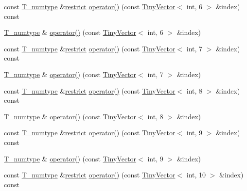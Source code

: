 \begin{DoxyCompactItemize}
\item 
const \hyperlink{classArray_ae72770f4a1d2f8b7193badafc320f008}{T\+\_\+numtype} \&\hyperlink{compiler_8h_a080abdcb9c02438f1cd2bb707af25af8}{restrict} \hyperlink{classArray_a366456aa63f9f9b54ade2e5ce2de8f9a}{operator()} (const \hyperlink{classTinyVector}{Tiny\+Vector}$<$ int, 6 $>$ \&index) const 
\item 
\hyperlink{classArray_ae72770f4a1d2f8b7193badafc320f008}{T\+\_\+numtype} \& \hyperlink{classArray_a68955d7efb206caf0365b81286f5430d}{operator()} (const \hyperlink{classTinyVector}{Tiny\+Vector}$<$ int, 6 $>$ \&index)
\item 
const \hyperlink{classArray_ae72770f4a1d2f8b7193badafc320f008}{T\+\_\+numtype} \&\hyperlink{compiler_8h_a080abdcb9c02438f1cd2bb707af25af8}{restrict} \hyperlink{classArray_a33104477dc9ae6b2eae364f7e3f9dfba}{operator()} (const \hyperlink{classTinyVector}{Tiny\+Vector}$<$ int, 7 $>$ \&index) const 
\item 
\hyperlink{classArray_ae72770f4a1d2f8b7193badafc320f008}{T\+\_\+numtype} \& \hyperlink{classArray_afe7da01389d310f5c7619fa138444e78}{operator()} (const \hyperlink{classTinyVector}{Tiny\+Vector}$<$ int, 7 $>$ \&index)
\item 
const \hyperlink{classArray_ae72770f4a1d2f8b7193badafc320f008}{T\+\_\+numtype} \&\hyperlink{compiler_8h_a080abdcb9c02438f1cd2bb707af25af8}{restrict} \hyperlink{classArray_a4e2a5777a148764b69e5d44ff842dc48}{operator()} (const \hyperlink{classTinyVector}{Tiny\+Vector}$<$ int, 8 $>$ \&index) const 
\item 
\hyperlink{classArray_ae72770f4a1d2f8b7193badafc320f008}{T\+\_\+numtype} \& \hyperlink{classArray_a8e8020e92047dfb639d86e111fd4c1d3}{operator()} (const \hyperlink{classTinyVector}{Tiny\+Vector}$<$ int, 8 $>$ \&index)
\item 
const \hyperlink{classArray_ae72770f4a1d2f8b7193badafc320f008}{T\+\_\+numtype} \&\hyperlink{compiler_8h_a080abdcb9c02438f1cd2bb707af25af8}{restrict} \hyperlink{classArray_a5332878401c9ec81caefa6bf54772ca0}{operator()} (const \hyperlink{classTinyVector}{Tiny\+Vector}$<$ int, 9 $>$ \&index) const 
\item 
\hyperlink{classArray_ae72770f4a1d2f8b7193badafc320f008}{T\+\_\+numtype} \& \hyperlink{classArray_a9a18fd394f552ed38d5f09a2f0ad580f}{operator()} (const \hyperlink{classTinyVector}{Tiny\+Vector}$<$ int, 9 $>$ \&index)
\item 
const \hyperlink{classArray_ae72770f4a1d2f8b7193badafc320f008}{T\+\_\+numtype} \&\hyperlink{compiler_8h_a080abdcb9c02438f1cd2bb707af25af8}{restrict} \hyperlink{classArray_a9fb1eda95e4bb0d2e112d84e134c5002}{operator()} (const \hyperlink{classTinyVector}{Tiny\+Vector}$<$ int, 10 $>$ \&index) const 

\end{DoxyCompactItemize}
